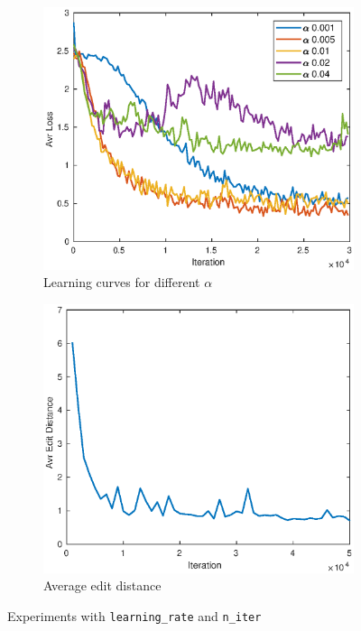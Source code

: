 \documentclass[12pt]{article}
\begin{document}
\begin{figure}[t!]
    \begin{subfigure}[t]{0.5\textwidth}
        \centering
        \includegraphics[width=\linewidth]{img/learning_rate2.eps}
        \caption{Learning curves for different $\alpha$}
        \label{fig_learning_rate}
    \end{subfigure}
    \begin{subfigure}[t]{0.5\textwidth}
        \centering
        \includegraphics[width=\linewidth]{img/n_iter2.eps}
        \caption{Average edit distance}
        \label{fig_n_iter}
    \end{subfigure}
	\caption{Experiments with \texttt{learning\_rate} and \texttt{n\_iter}}
	\label{fig_train_param}
\end{figure}
\end{document}
